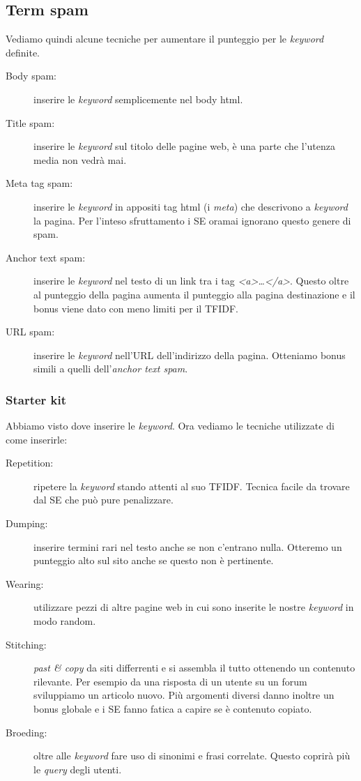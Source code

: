 		\subsection{Term spam}
			Vediamo quindi alcune tecniche per aumentare il punteggio per le \emph{keyword} definite.
			\begin{description}
				\item[Body spam:] inserire le \emph{keyword} semplicemente nel body html.
				\item[Title spam:] inserire le \emph{keyword} sul titolo delle pagine web, è una parte che l'utenza media non vedrà mai.
				\item[Meta tag spam:] inserire le \emph{keyword} in appositi tag html (i \emph{meta}) che descrivono a \emph{keyword} la pagina. Per l'inteso sfruttamento i SE oramai ignorano questo genere di spam.
				\item[Anchor text spam:] inserire le \emph{keyword} nel testo di un link tra i tag \emph{<a>\dots </a>}. Questo oltre al punteggio della pagina aumenta il punteggio alla pagina destinazione e il bonus viene dato con meno limiti per il TFIDF.
				\item[URL spam:] inserire le \emph{keyword} nell'URL dell'indirizzo della pagina. Otteniamo bonus simili a quelli dell'\emph{anchor text spam}.
			\end{description}
			
		
			\subsubsection{Starter kit}
				Abbiamo visto dove inserire le \emph{keyword}. Ora vediamo le tecniche utilizzate di come inserirle:
				\begin{description}
					\item[Repetition:] ripetere la \emph{keyword} stando attenti al suo TFIDF. Tecnica facile da trovare dal SE che può pure penalizzare.
					\item[Dumping:] inserire termini rari nel testo anche se non c'entrano nulla. Otteremo un punteggio alto sul sito anche se questo non è pertinente.
					\item[Wearing:] utilizzare pezzi di altre pagine web in cui sono inserite le nostre \emph{keyword} in modo random.
					\item[Stitching:] \emph{past \& copy} da siti differrenti e si assembla il tutto ottenendo un contenuto rilevante. Per esempio da una risposta di un utente su un forum sviluppiamo un articolo nuovo. Più argomenti diversi danno inoltre un bonus globale e i SE fanno fatica a capire se è contenuto copiato.
					\item[Broeding:] oltre alle \emph{keyword} fare uso di sinonimi e frasi correlate. Questo coprirà più le \emph{query} degli utenti.
				\end{description}		
		
